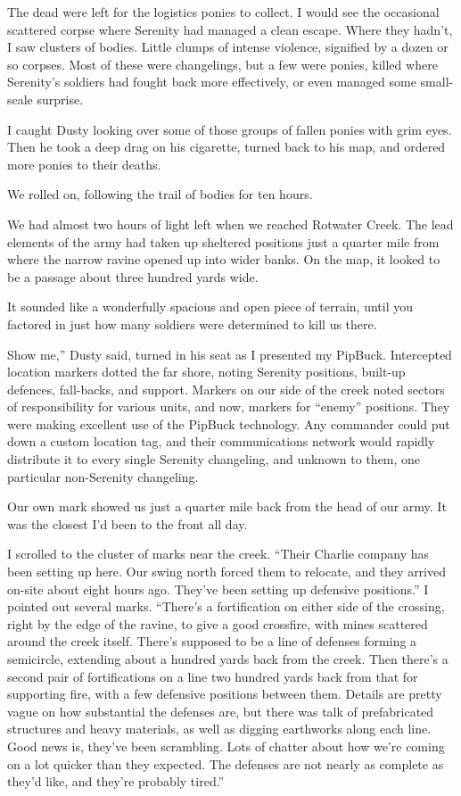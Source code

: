 The dead were left for the logistics ponies to collect. I would see the occasional scattered corpse where Serenity had managed a clean escape. Where they hadn’t, I saw clusters of bodies. Little clumps of intense violence, signified by a dozen or so corpses. Most of these were changelings, but a few were ponies, killed where Serenity’s soldiers had fought back more effectively, or even managed some small-scale surprise.

I caught Dusty looking over some of those groups of fallen ponies with grim eyes. Then he took a deep drag on his cigarette, turned back to his map, and ordered more ponies to their deaths.

We rolled on, following the trail of bodies for ten hours.

{\br}%
We had almost two hours of light left when we reached Rotwater Creek. The lead elements of the army had taken up sheltered positions just a quarter mile from where the narrow ravine opened up into wider banks. On the map, it looked to be a passage about three hundred yards wide.

It sounded like a wonderfully spacious and open piece of terrain, until you factored in just how many soldiers were determined to kill us there.

\leavevmode{}Show me,” Dusty said, turned in his seat as I presented my PipBuck. Intercepted location markers dotted the far shore, noting Serenity positions, built-up defences, fall-backs, and support. Markers on our side of the creek noted sectors of responsibility for various units, and now, markers for “enemy” positions. They were making excellent use of the PipBuck technology. Any commander could put down a custom location tag, and their communications network would rapidly distribute it to every single Serenity changeling, and unknown to them, one particular non-Serenity changeling.

Our own mark showed us just a quarter mile back from the head of our army. It was the closest I’d been to the front all day.

I scrolled to the cluster of marks near the creek. “Their Charlie company has been setting up here. Our swing north forced them to relocate, and they arrived on-site about eight hours ago. They’ve been setting up defensive positions.” I pointed out several marks. “There’s a fortification on either side of the crossing, right by the edge of the ravine, to give a good crossfire, with mines scattered around the creek itself. There’s supposed to be a line of defenses forming a semicircle, extending about a hundred yards back from the creek. Then there’s a second pair of fortifications on a line two hundred yards back from that for supporting fire, with a few defensive positions between them. Details are pretty vague on how substantial the defenses are, but there was talk of prefabricated structures and heavy materials, as well as digging earthworks along each line. Good news is, they’ve been scrambling. Lots of chatter about how we’re coming on a lot quicker than they expected. The defenses are not nearly as complete as they’d like, and they’re probably tired.”

